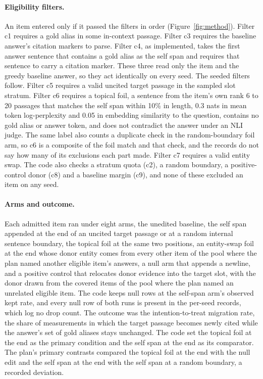 \documentclass[11pt]{article}
\begin{document}
\paragraph{Eligibility filters.} An item entered only if it passed the filters in order (Figure~\ref{fig:method}). Filter c1 requires a gold alias in some in-context passage. Filter c3 requires the baseline answer's citation markers to parse. Filter c4, as implemented, takes the first answer sentence that contains a gold alias as the self span and requires that sentence to carry a citation marker. These three read only the item and the greedy baseline answer, so they act identically on every seed. The seeded filters follow. Filter c5 requires a valid uncited target passage in the sampled slot stratum. Filter c6 requires a topical foil, a sentence from the item's own rank 6 to 20 passages that matches the self span within 10\% in length, 0.3 nats in mean token log-perplexity and 0.05 in embedding similarity to the question, contains no gold alias or answer token, and does not contradict the answer under an NLI judge. The same label also counts a duplicate check in the random-boundary foil arm, so c6 is a composite of the foil match and that check, and the records do not say how many of its exclusions each part made. Filter c7 requires a valid entity swap. The code also checks a stratum quota (c2), a random boundary, a positive-control donor (c8) and a baseline margin (c9), and none of these excluded an item on any seed.

\paragraph{Arms and outcome.} Each admitted item ran under eight arms, the unedited baseline, the self span appended at the end of an uncited target passage or at a random internal sentence boundary, the topical foil at the same two positions, an entity-swap foil at the end whose donor entity comes from every other item of the pool where the plan named another eligible item's answers, a null arm that appends a newline, and a positive control that relocates donor evidence into the target slot, with the donor drawn from the covered items of the pool where the plan named an unrelated eligible item. The code keeps null rows at the self-span arm's observed kept rate, and every null row of both runs is present in the per-seed records, which log no drop count. The outcome was the intention-to-treat migration rate, the share of measurements in which the target passage becomes newly cited while the answer's set of gold aliases stays unchanged. The code set the topical foil at the end as the primary condition and the self span at the end as its comparator. The plan's primary contrasts compared the topical foil at the end with the null edit and the self span at the end with the self span at a random boundary, a recorded deviation.
\end{document}
